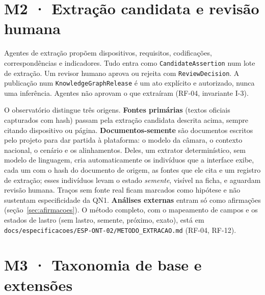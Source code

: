 \documentclass[12pt,a4paper,oneside,english,brazil]{abntex2}
\newcommand{\rf}[1]{{\footnotesize(#1)}}
\begin{document}
\section{M2 · Extração candidata e revisão humana}
Agentes de extração propõem dispositivos, requisitos, codificações, correspondências e indicadores. Tudo entra como \texttt{CandidateAssertion} num lote de extração. Um revisor humano aprova ou rejeita com \texttt{ReviewDecision}. A publicação num \texttt{KnowledgeGraphRelease} é um ato explícito e autorizado, nunca uma inferência. Agentes não aprovam o que extraíram \rf{RF-04, invariante I-3}.

O observatório distingue três origens. \textbf{Fontes primárias} (textos oficiais capturados com hash) passam pela extração candidata descrita acima, sempre citando dispositivo ou página. \textbf{Documentos-semente} são documentos escritos pelo projeto para dar partida à plataforma: o modelo da câmara, o contexto nacional, o cenário e os alinhamentos. Deles, um extrator determinístico, sem modelo de linguagem, cria automaticamente os indivíduos que a interface exibe, cada um com o hash do documento de origem, as fontes que ele cita e um registro de extração; esses indivíduos levam o estado \emph{semente}, visível na ficha, e aguardam revisão humana. Traços sem fonte real ficam marcados como hipótese e não sustentam especificidade da QN1. \textbf{Análises externas} entram só como afirmações (seção~\ref{sec:afirmacoes}). O método completo, com o mapeamento de campos e os estados de lastro (sem lastro, semente, próximo, exato), está em \texttt{docs/especificacoes/ESP-ONT-02/METODO\_EXTRACAO.md} \rf{RF-04, RF-12}.

\section{M3 · Taxonomia de base e extensões}\label{sec:taxonomia}
\end{document}
